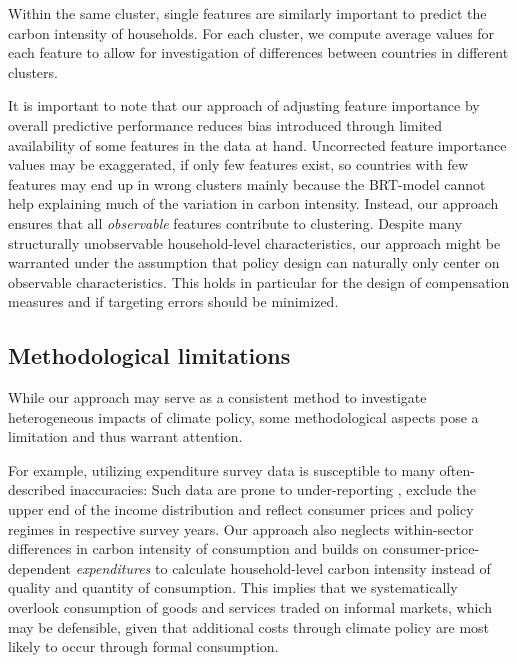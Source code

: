 \documentclass[12pt, a4paper]{article}
\begin{document}
Within the same cluster, single features are similarly important to predict the carbon intensity of households. For each cluster, we compute average values for each feature to allow for investigation of differences between countries in different clusters.%

It is important to note that our approach of adjusting feature importance by overall predictive performance reduces bias introduced through limited availability of some features in the data at hand. Uncorrected feature importance values may be exaggerated, if only few features exist, so countries with few features may end up in wrong clusters mainly because the BRT-model cannot help explaining much of the variation in carbon intensity. Instead, our approach ensures that all \textit{observable} features contribute to clustering. Despite many structurally unobservable household-level characteristics, our approach might be warranted under the assumption that policy design can naturally only center on observable characteristics. This holds in particular for the design of compensation measures and if targeting errors should be minimized.

\subsection{Methodological limitations}

While our approach may serve as a consistent method to investigate heterogeneous impacts of climate policy, some methodological aspects pose a limitation and thus warrant attention.

For example, utilizing expenditure survey data is susceptible to many often-described inaccuracies: Such data are prone to under-reporting \autocite{Meyer.2015}, exclude the upper end of the income distribution \autocite{Blanchet.2022} and reflect consumer prices and policy regimes in respective survey years. Our approach also neglects within-sector differences in carbon intensity of consumption and builds on consumer-price-dependent \textit{expenditures} to calculate household-level carbon intensity instead of quality and quantity of consumption. This implies that we systematically overlook consumption of goods and services traded on informal markets, which may be defensible, given that additional costs through climate policy are most likely to occur through formal consumption.
\end{document}
